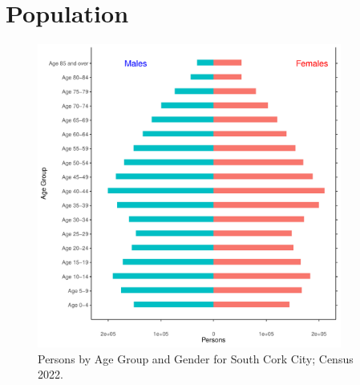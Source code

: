 \documentclass{article}
\begin{document}
\pagebreak

\section{Population} 
\label{sect:Pop}

\begin{figure}[h]
	\centering
	\includegraphics[width = 100mm]{../figures/PyramidPlot.pdf}
	\caption{Persons by Age Group and Gender for South Cork City; Census 2022.}
	\label{fig:2ae19629-1a6a-13a3-e055-000000000001}
	\end{figure}
\end{document}

